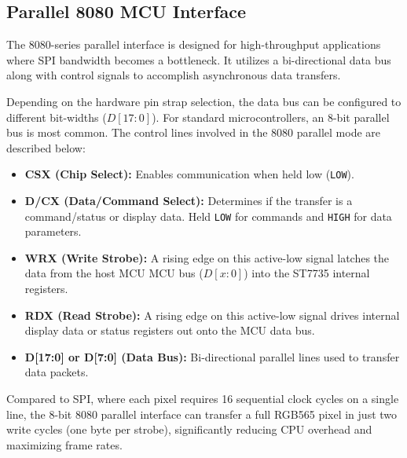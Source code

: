 \documentclass[pdflatex,sn-mathphys-num]{sn-jnl}%
\begin{document}
\subsection{Parallel 8080 MCU Interface}
The 8080-series parallel interface is designed for high-throughput applications where SPI bandwidth becomes a bottleneck. It utilizes a bi-directional data bus along with control signals to accomplish asynchronous data transfers. 

Depending on the hardware pin strap selection, the data bus can be configured to different bit-widths ($D[17:0]$). For standard microcontrollers, an 8-bit parallel bus is most common. The control lines involved in the 8080 parallel mode are described below:
\begin{itemize}
    \item \textbf{CSX (Chip Select):} Enables communication when held low (\texttt{LOW}).
    \item \textbf{D/CX (Data/Command Select):} Determines if the transfer is a command/status or display data. Held \texttt{LOW} for commands and \texttt{HIGH} for data parameters.
    \item \textbf{WRX (Write Strobe):} A rising edge on this active-low signal latches the data from the host MCU MCU bus ($D[x:0]$) into the ST7735 internal registers.
    \item \textbf{RDX (Read Strobe):} A rising edge on this active-low signal drives internal display data or status registers out onto the MCU data bus.
    \item \textbf{D[17:0] or D[7:0] (Data Bus):} Bi-directional parallel lines used to transfer data packets.
\end{itemize}

Compared to SPI, where each pixel requires 16 sequential clock cycles on a single line, the 8-bit 8080 parallel interface can transfer a full RGB565 pixel in just two write cycles (one byte per strobe), significantly reducing CPU overhead and maximizing frame rates.
\end{document}
